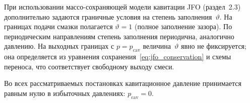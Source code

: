 При использовании массо-сохраняющей модели кавитации JFO (раздел~2.3) дополнительно задаются граничные условия на степень заполнения~$\vartheta$. На границах подачи смазки полагается $\vartheta = 1$ (полное заполнение зазора). По периодическим направлениям степень заполнения периодична, аналогично давлению. На выходных границах с $p = p_{\mathrm{cav}}$ величина~$\vartheta$ явно не фиксируется; она определяется из уравнения сохранения~\eqref{eq:jfo_conservation} и схемы переноса, что соответствует свободному выходу смеси.

Во всех рассматриваемых постановках кавитационное давление принимается равным нулю в избыточных давлениях: $p_{\mathrm{cav}} = 0$.
